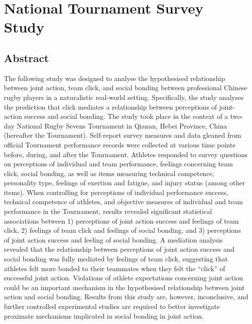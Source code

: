 \chapter{\label{chap:tournamentSurvey}National Tournament Survey Study}
                                            \begin{CJK}{UTF8}{gbsn}

\minitoc
\section{Abstract}

The following study was designed to analyse the hypothesised relationship between joint action, team click, and social bonding between professional Chinese rugby players in a naturalistic real-world setting.  Specifically, the study analyses the prediction that click mediates a relationship between perceptions of joint-action success and social bonding.  The study took place in the context of a two-day National Rugby Sevens Tournament in Qianan, Hebei Province, China (hereafter the Tournament).  Self-report survey measures and data gleaned from official Tournament performance records were collected at various time points before, during, and after the Tournament.  Athletes responded to survey questions on perceptions of individual and team performance, feelings concerning team click, social bonding, as well as items measuring technical competence, personality type, feelings of exertion and fatigue, and injury status (among other items). When controlling for perceptions of individual performance success, technical competence of athletes, and objective measures of individual and team performance in the Tournament, results revealed significant statistical associations between 1) perceptions of joint action success and feelings of team click, 2) feelings of team click and feelings of social bonding, and 3) perceptions of joint action success and feeling of social bonding.  A mediation analysis revealed that the relationship between perceptions of joint action success and social bonding was fully mediated by feelings of team click, suggesting that athletes felt more bonded to their teammates when they felt the ``click'' of successful joint action.  Violations of athlete expectations concerning joint action could be an important mechanism in the hypothesised relationship between joint action and social bonding. Results from this study are, however, inconclusive, and further controlled experimental studies are required to better investigate proximate mechanisms implicated in social bonding in joint action.


\end{CJK}
